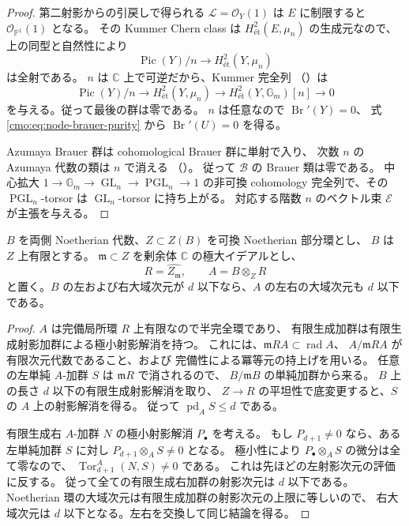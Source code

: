 \begin{proof}
第二射影からの引戻しで得られる $\mathcal L=\mathcal O_Y(1)$ は
$E$ に制限すると $\mathcal O_{\mathbb P^1}(1)$ となる。
その Kummer Chern class は
$H^2_{\text{ét}}(E,\mu_n)$ の生成元なので、
上の同型と自然性により
\[
 \operatorname{Pic}(Y)/n
 \longrightarrow H^2_{\text{ét}}(Y,\mu_n)
\]
は全射である。
$n$ は $\mathbb C$ 上で可逆だから、Kummer 完全列
（\cite[Lemma~59.28.1, Tag~03PK]{NFMStacksKummer}）は
\[
 \operatorname{Pic}(Y)/n
 \longrightarrow H^2_{\text{ét}}(Y,\mu_n)
 \longrightarrow H^2_{\text{ét}}(Y,\mathbb G_m)[n]
 \longrightarrow0
\]
を与える。従って最後の群は零である。
$n$ は任意なので $\operatorname{Br}'(Y)=0$、
式 \eqref{cmo:eq:node-brauer-purity} から
$\operatorname{Br}'(U)=0$ を得る。

Azumaya Brauer 群は cohomological Brauer 群に単射で入り、
次数 $n$ の Azumaya 代数の類は $n$ で消える
（\cite[Section~59.62, Lemma~59.62.2, Tag~0A2J]{CMOStacksNode}）。
従って $\mathcal B$ の Brauer 類は零である。
中心拡大
$1\to\mathbb G_m\to\operatorname{GL}_n\to
\operatorname{PGL}_n\to1$
の非可換 cohomology 完全列で、その
$\operatorname{PGL}_n$-torsor は $\operatorname{GL}_n$-torsor に持ち上がる。
対応する階数 $n$ のベクトル束 $\mathcal E$ が主張を与える。
\end{proof}

\begin{lemma}[完備化した有限代数の大域次元]
\label{cmo:lem:completion-global-dimension}
$B$ を両側 Noetherian 代数、$Z\subset Z(B)$ を可換 Noetherian 部分環とし、
$B$ は $Z$ 上有限とする。
$\mathfrak m\subset Z$ を剰余体 $\mathbb C$ の極大イデアルとし、
\[
 R=\widehat{Z_{\mathfrak m}},\qquad
 A=B\otimes_Z R
\]
と置く。$B$ の左および右大域次元が $d$ 以下なら、$A$ の左右の大域次元も
$d$ 以下である。
\end{lemma}
\begin{proof}
$A$ は完備局所環 $R$ 上有限なので半完全環であり、
有限生成加群は有限生成射影加群による極小射影解消を持つ。
これには、$\mathfrak m R A\subset\operatorname{rad}A$、
$A/\mathfrak m R A$ が有限次元代数であること、および
完備性による冪等元の持上げを用いる。
任意の左単純 $A$-加群 $S$ は $\mathfrak m R$ で消されるので、
$B/\mathfrak m B$ の単純加群から来る。
$B$ 上の長さ $d$ 以下の有限生成射影解消を取り、
$Z\to R$ の平坦性で底変更すると、$S$ の $A$ 上の射影解消を得る。
従って $\operatorname{pd}_A S\le d$ である。

有限生成右 $A$-加群 $N$ の極小射影解消 $P_\bullet$ を考える。
もし $P_{d+1}\ne0$ なら、ある左単純加群 $S$ に対し
$P_{d+1}\otimes_A S\ne0$ となる。
極小性により $P_\bullet\otimes_A S$ の微分は全て零なので、
$\operatorname{Tor}_{d+1}^A(N,S)\ne0$ である。
これは先ほどの左射影次元の評価に反する。
従って全ての有限生成右加群の射影次元は $d$ 以下である。
Noetherian 環の大域次元は有限生成加群の射影次元の上限に等しいので、
右大域次元は $d$ 以下となる。左右を交換して同じ結論を得る。
\end{proof}


